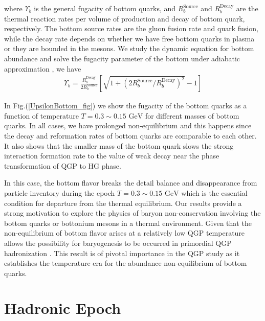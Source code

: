 \documentclass[universe,article,submit,moreauthors,pdftex,a4paper]{Definitions/mdpi}
\newcommand{\GeV}{\text{ GeV}}
\begin{document}
where $\Upsilon_b$ is the general fugacity of bottom quarks, and $R^{\mathrm{Source}}_{b}$ and $R^{\mathrm{Decay}}_{b}$ are the thermal reaction rates per volume of production and decay of bottom quark, respectively. The bottom source rates are the gluon fusion rate and quark fusion, while the decay rate depends on whether we have free bottom quarks in plasma or they are bounded in the mesons. We study the dynamic equation for bottom abundance and solve the fugacity parameter of the bottom under adiabatic approximation \cite{Yang:2020nne,Yang:2023bot}, we have
\begin{align}
\Upsilon_{b}=\frac{R^{\mathrm{Decay}}_{b}}{2R^{\mathrm{Source}}_{b}}\left[\sqrt{1+\left(2R^{\mathrm{Source}}_{b}/R^{\mathrm{Decay}}_{b}\right)^2}-1\right]
\end{align}

In Fig.(\ref{UpsilonBottom_fig}) we show the fugacity of the bottom quarks as a function of temperature $T=0.3\sim0.15\GeV$ for different masses of bottom quarks. In all cases, we have prolonged non-equilibrium and this happens since the decay and reformation rates of bottom quarks are comparable to each other. It also shows that  the smaller mass of the bottom quark slows the strong interaction formation rate to the value of weak decay near the phase transformation of QGP to HG phase.

In this case, the bottom flavor breaks the detail balance and disappearance from particle inventory during the epoch $T = 0.3 \sim0.15\GeV$ which is the essential condition for departure from the thermal equilibrium. Our results provide a strong motivation to explore the physics of baryon non-conservation involving the bottom quarks or bottonium mesons in a thermal environment. Given that the non-equilibrium of bottom flavor arises at a relatively low QGP temperature allows the possibility for baryogenesis to be occurred in primordial QGP hadronization \cite{Yang:2020nne,Yang:2023bot}. This result is of pivotal importance in the QGP study as it establishes the temperature era for the abundance non-equilibrium of bottom quarks.




\section{Hadronic Epoch}\label{sec:Hadrons}
\end{document}
